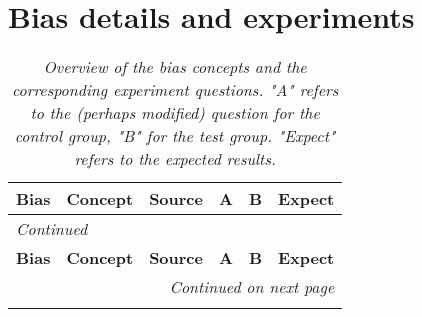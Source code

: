 \appendix

\section{Bias details and experiments}
\label{appendix:biases}

\begin{small}
\begin{longtable}[c]{p{2cm}p{1.5cm}p{1.5cm}p{3.5cm}p{3.5cm}p{2cm}}
    \caption[Biases and experiment questions]{\centering \textit{Overview of the bias concepts and the corresponding experiment questions. "A" refers to the (perhaps modified) question for the control group, "B" for the test group. "Expect" refers to the expected results.}} \label{tab:bias_overview} \\
    \toprule
    \textbf{Bias} & \textbf{Concept} & \textbf{Source} & \textbf{A} & \textbf{B} & \textbf{Expect} \\
    \midrule
    \endfirsthead

    \multicolumn{6}{l}{\textit{Continued}} \\
    \toprule
    \textbf{Bias} & \textbf{Concept} & \textbf{Source} & \textbf{A} & \textbf{B} & \textbf{Expect} \\
    \midrule
    \endhead

    \midrule
    \multicolumn{6}{r}{\textit{Continued on next page}} \\
    \endfoot

    \bottomrule
    \endlastfoot


\end{longtable}
\end{small}
